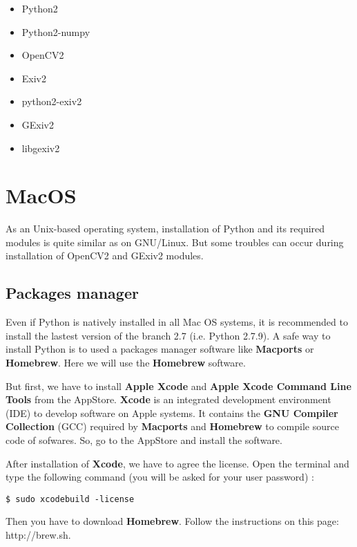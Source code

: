 \documentclass[a4paper, 11pt]{article}
\begin{document}
\begin{itemize}

\item Python2
\item Python2-numpy
\item OpenCV2
\item Exiv2
\item python2-exiv2
\item GExiv2
\item libgexiv2

\end{itemize}

\section{MacOS}

As an Unix-based operating system, installation of Python and its required modules is quite similar as on GNU/Linux. But some troubles can occur during installation of OpenCV2 and GExiv2 modules.

\subsection*{Packages manager}

Even if Python is natively installed in all Mac OS systems, it is recommended to install the lastest version of the branch 2.7 (i.e. Python 2.7.9). A safe way to install Python is to used a packages manager software like \textbf{Macports} or \textbf{Homebrew}. Here we will use the \textbf{Homebrew} software.

But first, we have to install \textbf{Apple Xcode} and \textbf{Apple Xcode Command Line Tools} from the AppStore. \textbf{Xcode} is an integrated development environment (IDE) to develop software on Apple systems. It contains the \textbf{GNU Compiler Collection} (GCC) required by \textbf{Macports} and \textbf{Homebrew} to compile source code of sofwares. So, go to the AppStore and install the software.

After installation of \textbf{Xcode}, we have to agree the license. Open the terminal and type the following command (you will be asked for your user password) :

\begin{verbatim}
$ sudo xcodebuild -license
\end{verbatim}

Then you have to download \textbf{Homebrew}. Follow the instructions on this page: http://brew.sh.
\end{document}
